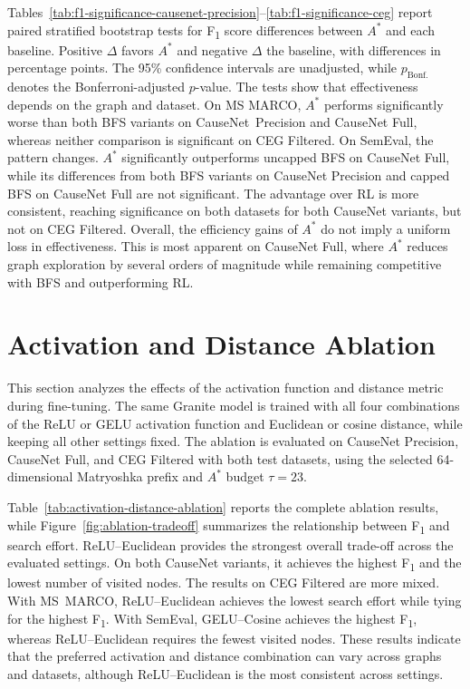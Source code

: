 Tables~\ref{tab:f1-significance-causenet-precision}--\ref{tab:f1-significance-ceg} report paired stratified bootstrap tests for F\textsubscript{1} score differences between $A^*$ and each baseline. Positive $\Delta$ favors $A^*$ and negative $\Delta$ the baseline, with differences in percentage points. The 95\% confidence intervals are unadjusted, while $p_{\mathrm{Bonf.}}$ denotes the Bonferroni-adjusted $p$-value. The tests show that effectiveness depends on the graph and dataset. On MS MARCO, $A^*$ performs significantly worse than both BFS variants on \mbox{CauseNet Precision} and CauseNet Full, whereas neither comparison is significant on CEG Filtered. On SemEval, the pattern changes. $A^*$ significantly outperforms uncapped BFS on CauseNet Full, while its differences from both BFS variants on CauseNet Precision and capped BFS on CauseNet Full are not significant. The advantage over RL is more consistent, reaching significance on both datasets for both CauseNet variants, but not on CEG Filtered. Overall, the efficiency gains of $A^*$ do not imply a uniform loss in effectiveness. This is most apparent on CauseNet Full, where $A^*$ reduces graph exploration by several orders of magnitude while remaining competitive with BFS and outperforming RL.




\section{Activation and Distance Ablation}
\label{sec:results-ablation}

This section analyzes the effects of the activation function and distance metric during fine-tuning. The same Granite model is trained with all four combinations of the ReLU or GELU activation function and Euclidean or cosine distance, while keeping all other settings fixed. The ablation is evaluated on CauseNet Precision, CauseNet Full, and CEG Filtered with both test datasets, using the selected 64-dimensional Matryoshka prefix and \(A^*\) budget \(\tau=23\).

Table~\ref{tab:activation-distance-ablation} reports the complete ablation results, while Figure~\ref{fig:ablation-tradeoff} summarizes the relationship between F\textsubscript{1} and search effort. ReLU--Euclidean provides the strongest overall trade-off across the evaluated settings. On both CauseNet variants, it achieves the highest F\textsubscript{1} and the lowest number of visited nodes. The results on CEG Filtered are more mixed. With \mbox{MS MARCO}, ReLU--Euclidean achieves the lowest search effort while tying for the highest F\textsubscript{1}. With SemEval, GELU--Cosine achieves the highest F\textsubscript{1}, whereas ReLU--Euclidean requires the fewest visited nodes. These results indicate that the preferred activation and distance combination can vary across graphs and datasets, although \mbox{ReLU--Euclidean} is the most consistent across settings.

